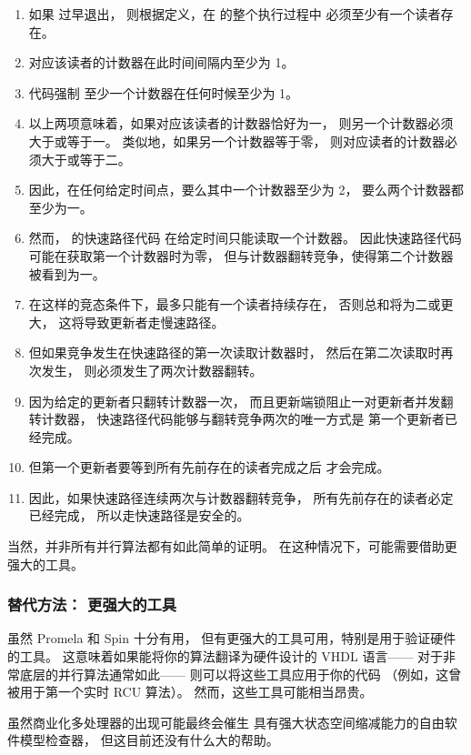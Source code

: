 \begin{enumerate}
\item	如果  过早退出，
	则根据定义，在  的整个执行过程中
	必须至少有一个读者存在。
\item	对应该读者的计数器在此时间间隔内至少为 1。
\item	{} 代码强制
	至少一个计数器在任何时候至少为 1。
\item	以上两项意味着，如果对应该读者的计数器恰好为一，
	则另一个计数器必须大于或等于一。
	类似地，如果另一个计数器等于零，
	则对应读者的计数器必须大于或等于二。
\item	因此，在任何给定时间点，要么其中一个计数器至少为 2，
	要么两个计数器都至少为一。
\item	然而， 的快速路径代码
	在给定时间只能读取一个计数器。
	因此快速路径代码可能在获取第一个计数器时为零，
	但与计数器翻转竞争，使得第二个计数器被看到为一。
\item	在这样的竞态条件下，最多只能有一个读者持续存在，
	否则总和将为二或更大，
	这将导致更新者走慢速路径。
\item	但如果竞争发生在快速路径的第一次读取计数器时，
	然后在第二次读取时再次发生，
	则必须发生了两次计数器翻转。
\item	因为给定的更新者只翻转计数器一次，
	而且更新端锁阻止一对更新者并发翻转计数器，
	快速路径代码能够与翻转竞争两次的唯一方式是
	第一个更新者已经完成。
\item	但第一个更新者要等到所有先前存在的读者完成之后
	才会完成。
\item	因此，如果快速路径连续两次与计数器翻转竞争，
	所有先前存在的读者必定已经完成，
	所以走快速路径是安全的。
\end{enumerate}

当然，并非所有并行算法都有如此简单的证明。
在这种情况下，可能需要借助更强大的工具。

\subsubsection{替代方法：
				     更强大的工具}
\label{sec:formal:Alternative Approach: More Capable Tools}

虽然 Promela 和 Spin 十分有用，
但有更强大的工具可用，特别是用于验证硬件的工具。
这意味着如果能将你的算法翻译为硬件设计的 VHDL 语言——
对于非常底层的并行算法通常如此——
则可以将这些工具应用于你的代码
（例如，这曾被用于第一个实时 RCU 算法）。
然而，这些工具可能相当昂贵。

虽然商业化多处理器的出现可能最终会催生
具有强大状态空间缩减能力的自由软件模型检查器，
但这目前还没有什么大的帮助。

